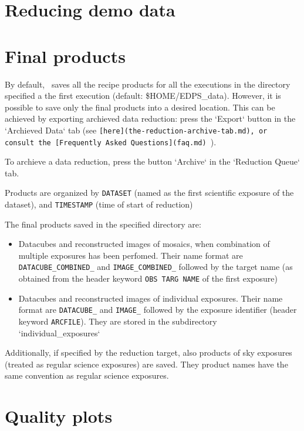\section{Reducing demo data}
\label{sec:muse_reducing_demo_data}


\section{Final products}

By default, \edps\ saves all the recipe products for all the
executions in the directory specified a the first execution (default:
\$HOME/EDPS\_data).  However, it is possible to save only the final
products into a desired location. This can be achieved by exporting
archieved data reduction: press the `Export` button in the `Archieved
Data` tab (see \verb|[here](the-reduction-archive-tab.md), or consult the [Frequently Asked Questions](faq.md) |).

To archieve a data reduction, press the button `Archive` in the
`Reduction Queue` tab.

Products are organized by {\tt DATASET} (named as the first scientific
exposure of the dataset), and {\tt TIMESTAMP} (time of start of
reduction)

The final products saved in the specified directory are:

\begin{itemize}
\item Datacubes and reconstructed images of mosaics, when combination of multiple exposures has been perfomed. Their name
  format are
  {\tt DATACUBE\_COMBINED\_} and {\tt IMAGE\_COMBINED\_} followed by the target name (as obtained from the header
  keyword {\tt OBS TARG NAME} of the first exposure)
\item Datacubes and reconstructed images of individual exposures. Their name format are
  {\tt DATACUBE\_} and {\tt IMAGE\_} followed by the exposure identifier (header keyword {\tt ARCFILE}).
  They are stored in the subdirectory `individual\_exposures`

\end{itemize}
Additionally, if specified by the reduction target, also products
of sky exposures (treated as regular science exposures) are saved. They product names have the same convention as
regular science exposures.

\section{Quality plots}


